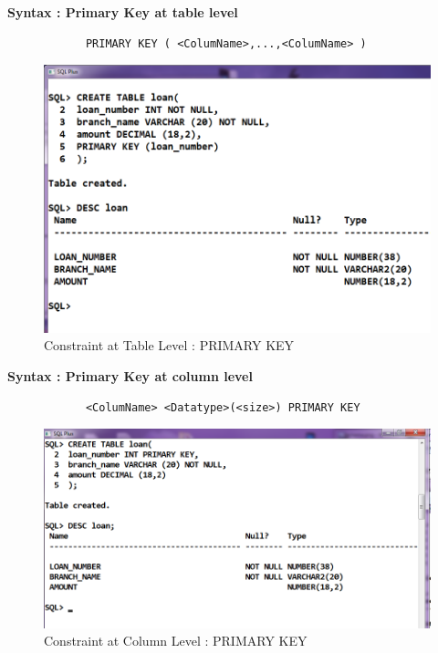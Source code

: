 \documentclass[12pt,a4paper]{report}
\begin{document}
\begin{enumerate}
{		\newpage 
		\textbf{Syntax : Primary Key at table level}
		\begin{verbatim}
			PRIMARY KEY ( <ColumName>,...,<ColumName> )
		\end{verbatim}
		\begin{figure}[H]
			\centering
			\includegraphics[scale=.45]{./images/2_table_level_primery_key_constraints}
			\caption{Constraint at Table Level : PRIMARY KEY}
		\end{figure}
				
		\textbf{Syntax : Primary Key at column level}
		\begin{verbatim}
			<ColumName> <Datatype>(<size>) PRIMARY KEY		
		\end{verbatim}				
		\begin{figure}[H]
			\centering
			\includegraphics[scale=.45]{./images/2_columan_level_primery_key_constraints}
			\caption{Constraint at Column Level : PRIMARY KEY}
		\end{figure}
				
		}	
	\clearpage
	\newpage	


\end{enumerate}
\end{document}
